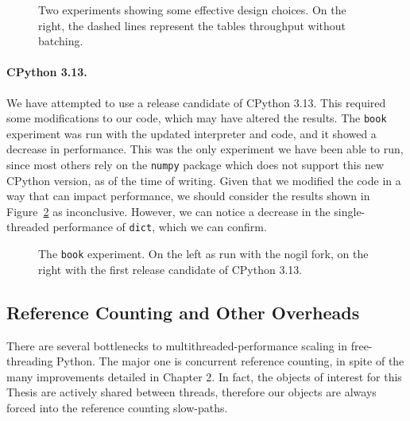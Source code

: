 \begin{figure}
    \begin{centering}
        \scalebox{0.4}{}%
        \scalebox{0.4}{}
        \caption{Two experiments showing some effective design choices. On the right, the dashed lines represent the tables throughput without batching.}
        \label{fig:prepotenza}
    \end{centering}
\end{figure}

\paragraph{CPython 3.13.}
We have attempted to use a release candidate of CPython 3.13.
This required some modifications to our code, which may have altered the results.
The \texttt{book} experiment was run with the updated interpreter and code, and it showed a decrease in performance.
This was the only experiment we have been able to run, since most others rely on the \texttt{numpy} package which does not support this new CPython version, as of the time of writing.
Given that we modified the code in a way that can impact performance, we should consider the results shown in Figure~\ref{fig:book-3.13} as inconclusive.
However, we can notice a decrease in the single-threaded performance of \texttt{dict}, which we can confirm.

\begin{figure}
    \begin{centering}
        \scalebox{0.4}{}%
        \scalebox{0.4}{}
        \caption{The \texttt{book} experiment. On the left as run with the nogil fork, on the right with the first release candidate of CPython 3.13.}
        \label{fig:book-3.13}
    \end{centering}
\end{figure}

\subsection{Reference Counting and Other Overheads}\label{subsec:measurements-overheads}

There are several bottlenecks to multithreaded-performance scaling in free-threading Python.
The major one is concurrent reference counting, in spite of the many improvements detailed in Chapter 2.
In fact, the objects of interest for this Thesis are actively shared between threads, therefore our objects are always forced into the reference counting slow-paths.

